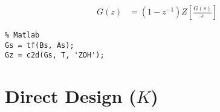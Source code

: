\documentclass{article}
\newcommand{\sincludepdf}[2][]{
	
}
\begin{document}
\begin{align}
	G(z) &= (1 - z^{-1}) Z \left[ \frac{G(s)}{s} \right]
\end{align}

\begin{lstlisting}
% Matlab
Gs = tf(Bs, As);
Gz = c2d(Gs, T, 'ZOH');
\end{lstlisting}

\sincludepdf[pages={8},
			pagecommand=\subsection*{Example 1}
	]{scan/11211301.pdf}

\sincludepdf[pages={6},
			pagecommand=\subsection*{Example 2}
		]{scan/11221301.pdf}
\sincludepdf[pages={7}]{scan/11221301.pdf}

\sincludepdf[pages={1},
			pagecommand=\subsection*{Example 3}
		]{scan/11221301.pdf}
\sincludepdf[pages={2}]{scan/11221301.pdf}

\sincludepdf[pages={1},
			pagecommand=\subsection*{Example 4}
		]{scan/11241301.pdf}
\sincludepdf[pages={2}]{scan/11241301.pdf}


\clearpage
\section{Direct Design ($K$)}
\label{sec:dd}
\end{document}
